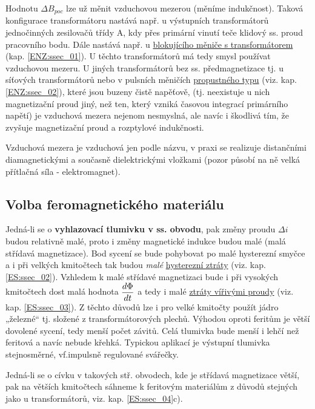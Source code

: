 {      Hodnotu \(\Delta B_{poc}\) lze už měnit vzduchovou mezerou (měníme indukčnost). Taková 
      konfigurace transformátoru nastává např. u výstupních transformátorů jednočinných zesilovačů 
      třídy A, kdy přes primární vinutí teče klidový ss. proud pracovního bodu. Dále nastává např. 
      u \hyperlink{ENZ:ssec_01}{blokujícího měniče s transformátorem} (kap. \ref{ENZ:ssec_01}). U 
      těchto transformátorů má tedy smysl používat vzduchovou mezeru. U jiných transformátorů bez 
      ss. předmagnetizace tj. u síťových transformátorů nebo v pulsních měničích 
      \hyperlink{ENZ:ssec_02}{propustného typu} (viz. kap. \ref{ENZ:ssec_02}), které jsou buzeny 
      čistě napěťově, (tj. neexistuje u nich magnetizační proud jiný, než ten, který vzniká 
      časovou integrací primárního napětí) je vzduchová mezera nejenom nesmyslná, ale navíc i 
      škodlivá tím, že zvyšuje magnetizační proud a rozptylové indukčnosti.
      
      \begin{note}
        Vzduchová mezera je vzduchová jen podle názvu, v praxi se realizuje distančními
        diamagnetickými a současně dielektrickými vložkami (pozor působí na ně velká přítlačná 
        síla - elektromagnet).
      \end{note}
    
    \subsection{Volba feromagnetického materiálu}
      Jedná-li se o \textbf{vyhlazovací tlumivku v ss. obvodu}, pak změny proudu \(\Delta i\) 
      budou relativně malé, proto i změny magnetické indukce budou malé (malá střídavá 
      magnetizace). Bod sycení se bude pohybovat po malé hysterezní smyčce a i při velkých 
      kmitočtech tak budou \emph{malé} \hyperlink{ES:ssec_02}{hysterezní ztráty} (viz. kap. 
      \ref{ES:ssec_02}). Vzhledem k malé střídavé magnetizaci bude i při vysokých kmitočtech dost 
      malá hodnota \(\dfrac{d \Phi}{d t}\) a tedy i malé \hyperlink{ES:ssec_03}{ztráty vířivými proudy} 
      (viz. kap. \ref{ES:ssec_03}). Z těchto důvodů lze i pro velké kmitočty použít jádro „železné“ 
      tj. složené z transformátorových plechů. Výhodou oproti feritům je větší dovolené sycení, 
      tedy menší počet závitů. Celá tlumivka bude menší i lehčí než feritová a navíc nebude křehká. 
      Typickou aplikací je výstupní tlumivka stejnosměrné, vf.impulsně regulované svářečky.
      
      Jedná-li se o cívku v takových stř. obvodech, kde je střídavá magnetizace větší, pak na 
      větších kmitočtech sáhneme k feritovým materiálům z důvodů stejných jako u transformátorů, 
      viz. kap. \ref{ES:ssec_04}c).
    
}

